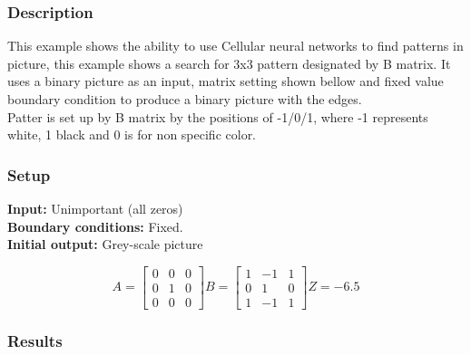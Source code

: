 \subsubsection{Description}
This example shows the ability to use Cellular neural networks to find patterns in picture, this example shows a search for 3x3  pattern designated by B matrix. It uses a binary picture as an input, matrix setting shown bellow and fixed value boundary condition to produce a binary picture with the edges.
\\ Patter is set up by B matrix by the positions of -1/0/1, where -1 represents white, 1 black and 0 is for non specific color. 
\subsubsection{Setup}

\textbf{Input:} Unimportant (all zeros)\\
\textbf{Boundary conditions:} Fixed.\\
\textbf{Initial output:} Grey-scale picture

\begin{minipage}{0.9\linewidth}
\begin{equation}
A =
\begin{bmatrix}
 0 &  0 &  0 \\
  0 &  1 &  0 \\
  0 &  0 &  0
\end{bmatrix}
B =
\begin{bmatrix}
 1 & -1 & 1 \\
 0 & 1 & 0 \\
 1 & -1 & 1
\end{bmatrix}
Z = -6.5
\end{equation}
\end{minipage}

\subsubsection{Results}


